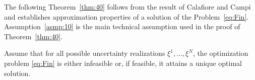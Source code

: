 

The following Theorem~\ref{thm:40} follows from the result of Calafiore and Campi~\cite{calafiore2006scenario} and establishes approximation properties of a solution of the Problem~\eqref{eq:Fin}. Assumption~\ref{asmp:10} is the main technical assumption used in the proof of Theorem~\ref{thm:40}.

\begin{assumption}\label{asmp:10}
Assume that for all possible uncertainty realizations $\xi^1, \dots, \xi^N$, the optimization problem \eqref{eq:Fin} is either infeasible or, if feasible, it attains a unique optimal solution.
\end{assumption}

